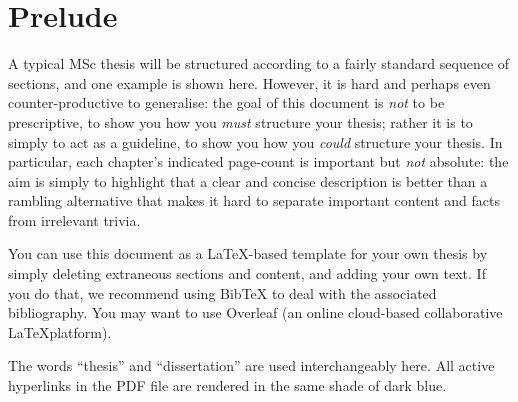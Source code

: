\documentclass[ %
                    author={Ashrey Ashrey, Sanya Kapoor, Trisha Sharma, Yash Bhooshan Pandloskar},
                supervisor={Dr. Dalila O’Grady},
                    degree={MSc},
                     title={Using machine learning to forecast physical activity participation, volunteering and activity patterns in London},
                  subtitle={},
                      type={},
                      year={2021}]{dissertation}
\begin{document}


\section*{Prelude}
\thispagestyle{empty}


A typical MSc thesis will be structured according to a fairly standard sequence of 
sections, and one example is shown here.  However, it is hard and perhaps even 
counter-productive to generalise: the goal of this document is {\em not}\/ to be prescriptive, to show you how you {\em must} structure your thesis; rather it is to simply to act as a guideline, to show you how you {\em could} structure your thesis.  In particular, each chapter's indicated page-count is
important but {\em not}\/ absolute: the aim is simply to highlight that a 
clear and concise description is better than a rambling alternative that makes
it hard to separate important content and facts from irrelevant trivia.

You can use this document as a \LaTeX-based 
template for your own thesis by simply deleting extraneous sections
and content, and adding your own text. If you do that, we recommend using BibTeX
to deal with the associated bibliography. 
You may want to use Overleaf (an online cloud-based collaborative \LaTeX platform).


The words ``thesis'' and ``dissertation'' are used interchangeably here. All active hyperlinks in the PDF file are rendered in the same shade of dark blue. 






\maketitle

\end{document}
